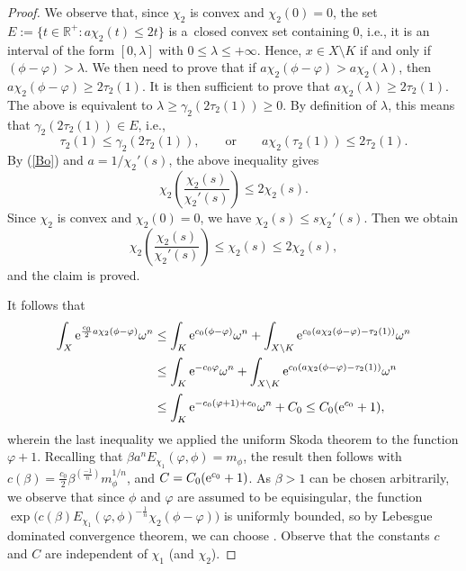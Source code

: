 \documentclass[pdftex]{sigma}
\numberwithin{equation}{section}
\theoremstyle{plain}
\begin{document}
\begin{proof}
We observe that, since $\chi_2$ is convex and $\chi_2(0) = 0$, the set $E:=\{ t \in \mathbb{R}^+ \colon a\chi_2(t) \leq 2 t \}$ is a~closed convex set containing $0$, i.e., it is an interval of the form $[0, \lambda]$ with $0 \leq \lambda \leq + \infty$. Hence, $x\in X\setminus K$ if and only if $(\phi-\varphi)>\lambda$.
We then need to prove that if $ a\chi_2( \phi - \varphi) > a\chi_2( \lambda)$,
then
$ a \chi_2( \phi - \varphi) \geq {2 \tau_2(1)}$. It is then sufficient to prove that $a\chi_2( \lambda) \geq 2 \tau_2(1)$. The above is equivalent to $ \lambda \geq \gamma_2(2 \tau_2(1)) \geq 0$. By definition of $\lambda$, this means that $\gamma_2(2 \tau_2(1))\in E$, i.e.,
\[\tau_2(1) \leq \gamma_2(2 \tau_2(1)),\qquad \text{or} \qquad a \chi_2(\tau_2(1)) \leq 2 \tau_2(1).\]
By (\ref{Bo}) and $a=1/\chi_2'(s)$, the above inequality gives
\[\chi_2\left(\frac{\chi_2( s)}{\chi_2' (s)} \right) \leq 2 \chi_2(s).\]
Since $\chi_2$ is convex and $\chi_2(0) = 0$, we have
$\chi_2(s) \leq s \chi_2'(s)$.
Then we obtain
\[ \chi_2\left(\frac{\chi_2( s)}{\chi_2' (s)} \right) \leq \chi_2(s) \leq 2 \chi_2(s),\]
and the claim is proved.

It follows that
\begin{align*}%
\int_X {\rm e}^{\frac{c_0}{2} a \chi_2(\phi-\varphi)} \omega^n &\leq \int_K {\rm e}^{c_0 (\phi-\varphi)} \omega^n + \int_{X\setminus K}{\rm e}^{c_0(a\chi_2(\phi-\varphi) -\tau_2(1))} \omega^n\\
 &\leq \int_K {\rm e}^{-c_0 \varphi} \omega^n + \int_{X\setminus K}{\rm e}^{c_0(a\chi_2(\phi-\varphi) -\tau_2(1))} \omega^n \\
 &\leq\int_K {\rm e}^{-c_0 (\varphi+1)+c_0} \omega^n + C_0\leq C_0({\rm e}^{c_0}+1),
\end{align*}
wherein the last inequality we applied the uniform Skoda theorem to the function $\varphi + 1$. Recalling that $\beta a^n E_{\chi_1}(\varphi, \phi) = m_\phi$, the result then follows with
$c(\beta) = \frac{c_0}{2} \beta^{(\frac{-1}{n})}m_\phi^{1/n}$, and $C= C_0({\rm e}^{c_0}+1)$.
As $\beta>1$ can be chosen arbitrarily, we observe that since $\phi$ and $\varphi$ are assumed to be equisingular, the function $\exp \big( c(\beta) E_{\chi_1}(\varphi, \phi)^{-\frac{1}{n}} \chi_2(\phi-\varphi)\big)$ is uniformly bounded, so by Lebesgue dominated convergence theorem, we can choose .
Observe that the constants $c$ and $C$ are independent of $\chi_1$ (and $\chi_2$).
\end{proof}
\end{document}
